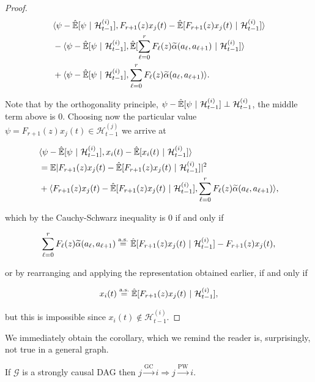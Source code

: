 \documentclass[12pt]{article}
\def\gc{\overset{\text{GC}}{\rightarrow}}  %
\def\pwgc{\overset{\text{PW}}{\rightarrow}}  %
\def\gcg{\mathcal{G}}  %
\def\H{\mathcal{H}}  %
\newcommand{\linE}[2]{\hat{\E}[#1\ |\ #2]}  %
\newcommand{\wtalpha}[2]{\widetilde{\alpha}(#1, #2)}  %
\begin{document}
\begin{proof}
  \begin{align*}
    &\inner{\psi - \linE{\psi}{\H_{t - 1}^{(i)}}}{F_{r + 1}(z)x_j(t) - \linE{F_{r + 1}(z)x_j(t)}{\H_{t - 1}^{(i)}}}\\
    &- \inner{\psi - \linE{\psi}{\H_{t - 1}^{(i)}}}{\linE{\sum_{\ell = 0}^r F_\ell(z)\wtalpha{a_\ell}{a_{\ell + 1}}}{\H_{t - 1}^{(i)}}}\\
    &+ \inner{\psi - \linE{\psi}{\H_{t - 1}^{(i)}}}{\sum_{\ell = 0}^r F_\ell(z)\wtalpha{a_\ell}{a_{\ell + 1}}}.
  \end{align*}

  Note that by the orthogonality principle, $\psi - \linE{\psi}{\H_{t - 1}^{(i)}} \perp \H_{t - 1}^{(i)}$, the middle term above is $0$.  Choosing now the particular value $\psi = F_{r + 1}(z)x_j(t) \in \H_{t - 1}^{(j)}$ we arrive at

  \begin{align*}
    &\inner{\psi - \linE{\psi}{\H_{t - 1}^{(i)}}}{x_i(t) - \linE{x_i(t)}{\H_{t - 1}^{(i)}}}\\
    &= \E|F_{r + 1}(z)x_j(t) - \linE{F_{r + 1}(z)x_j(t)}{\H_{t - 1}^{(i)}}|^2\\
    &+ \inner{F_{r + 1}(z)x_j(t) - \linE{F_{r + 1}(z)x_j(t)}{\H_{t - 1}^{(i)}}}{\sum_{\ell = 0}^r F_\ell(z) \wtalpha{a_\ell}{a_{\ell + 1}}},
  \end{align*}

  which by the Cauchy-Schwarz inequality is $0$ if and only if

  \begin{equation*}
    \sum_{\ell = 0}^r F_\ell(z) \wtalpha{a_\ell}{a_{\ell + 1}} \overset{\text{a.s.}}{=} \linE{F_{r + 1}(z)x_j(t)}{\H_{t - 1}^{(i)}} - F_{r + 1}(z)x_j(t),
  \end{equation*}

  or by rearranging and applying the representation obtained earlier, if and only if

  \begin{equation*}
    x_i(t) \overset{\text{a.s.}}{=} \linE{F_{r + 1}(z)x_j(t)}{\H_{t - 1}^{(i)}},
  \end{equation*}

  but this is impossible since $x_i(t) \not \in \H_{t - 1}^{(i)}$.
\end{proof}

We immediately obtain the corollary, which we remind the reader is,
surprisingly, not true in a general graph.

\begin{corollary}
  \label{cor:gc_implies_pwgc}
  If $\gcg$ is a strongly causal DAG then $j \gc i \Rightarrow j \pwgc i$.
\end{corollary}
\end{document}
